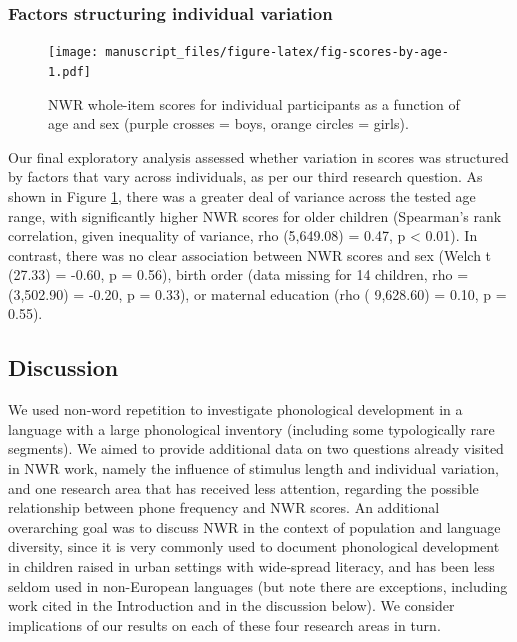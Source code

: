 \documentclass[english,,man,floatsintext]{apa6}
\begin{document}
\hypertarget{factors-structuring-individual-variation}{%
\subsubsection{Factors structuring individual variation}\label{factors-structuring-individual-variation}}

\begin{figure}
\centering
\texttt{[image: manuscript\_files/figure-latex/fig-scores-by-age-1.pdf]}
\caption{\label{fig:fig-scores-by-age}NWR whole-item scores for individual participants as a function of age and sex (purple crosses = boys, orange circles = girls).}
\end{figure}

Our final exploratory analysis assessed whether variation in scores was structured by factors that vary across individuals, as per our third research question. As shown in Figure \ref{fig:fig-scores-by-age}, there was a greater deal of variance across the tested age range, with significantly higher NWR scores for older children (Spearman's rank correlation, given inequality of variance, rho (5,649.08) = 0.47, p \textless{} 0.01). In contrast, there was no clear association between NWR scores and sex (Welch t (27.33) = -0.60, p = 0.56), birth order (data missing for 14 children, rho = (3,502.90) = -0.20, p = 0.33), or maternal education (rho ( 9,628.60) = 0.10, p = 0.55).

\hypertarget{discussion}{%
\subsection{Discussion}\label{discussion}}

We used non-word repetition to investigate phonological development in a language with a large phonological inventory (including some typologically rare segments). We aimed to provide additional data on two questions already visited in NWR work, namely the influence of stimulus length and individual variation, and one research area that has received less attention, regarding the possible relationship between phone frequency and NWR scores. An additional overarching goal was to discuss NWR in the context of population and language diversity, since it is very commonly used to document phonological development in children raised in urban settings with wide-spread literacy, and has been less seldom used in non-European languages (but note there are exceptions, including work cited in the Introduction and in the discussion below). We consider implications of our results on each of these four research areas in turn.
\end{document}
